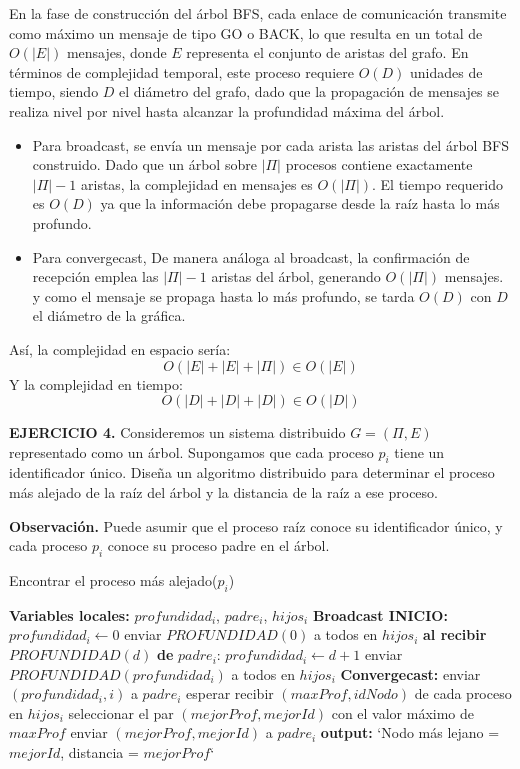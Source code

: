 \documentclass[12pt]{article}
\begin{document}
\noindent En la fase de construcción del árbol BFS, cada enlace de comunicación transmite como máximo un mensaje de tipo GO o BACK, lo que resulta en un total de $O(|E|)$ mensajes, donde $E$ representa el conjunto de aristas del grafo. En términos de complejidad temporal, este proceso requiere $O(D)$ unidades de tiempo, siendo $D$ el diámetro del grafo, dado que la propagación de mensajes se realiza nivel por nivel hasta alcanzar la profundidad máxima del árbol.
\begin{itemize}
    \item Para broadcast, se envía un mensaje por cada arista las aristas del árbol BFS construido. Dado que un árbol sobre $|\Pi|$ procesos contiene exactamente $|\Pi|-1$ aristas, la complejidad en mensajes es $O(|\Pi|)$. El tiempo requerido es $O(D)$ ya que la información debe propagarse desde la raíz hasta lo más profundo.

    \item Para convergecast, De manera análoga al broadcast, la confirmación de recepción emplea las $|\Pi|-1$ aristas del árbol, generando $O(|\Pi|)$ mensajes. y como el mensaje se propaga hasta lo más profundo, se tarda $O(D)$ con $D$ el diámetro de la gráfica.
\end{itemize}
Así, la complejidad en espacio sería:
\[O(|E| + |E| + |\Pi|) \in O(|E|)\]
Y la complejidad en tiempo:
\[O(|D| + |D| + |D|) \in O(|D|)\]


\begin{ejercicio}
\noindent \textbf{EJERCICIO 4.} 
Consideremos un sistema distribuido $G = (\Pi, E)$ representado como un árbol. Supongamos que cada proceso $p_i$ tiene un identificador único. Diseña un algoritmo distribuido para determinar el proceso más alejado de la raíz del árbol y la distancia de la raíz a ese proceso.

\noindent \textbf{Observación.} Puede asumir que el proceso raíz conoce su identificador único, y cada proceso $p_i$ conoce su proceso padre en el árbol. \\
\end{ejercicio}

\begin{algorithm}[H]
\caption{Encontrar el proceso más alejado($p_i$)}
\begin{algorithmic}[1]
\State \textbf{Variables locales:} $profundidad_i$, $padre_i$, $hijos_i$
\State \textbf{Broadcast INICIO:}
    \State $profundidad_i \gets 0$
    \State enviar $PROFUNDIDAD(0)$ a todos en $hijos_i$
\Else
    \State \textbf{al recibir} $PROFUNDIDAD(d)$ \textbf{de} $padre_i$:
    \State $profundidad_i \gets d + 1$
    \State enviar $PROFUNDIDAD(profundidad_i)$ a todos en $hijos_i$
\EndIf
\State \textbf{Convergecast:}
    \State enviar $(profundidad_i, i)$ a $padre_i$
\Else
    \State esperar recibir $(maxProf, idNodo)$ de cada proceso en $hijos_i$
    \State seleccionar el par $(mejorProf, mejorId)$ con el valor máximo de $maxProf$
        \State enviar $(mejorProf, mejorId)$ a $padre_i$
    \Else
        \State \textbf{output:} `Nodo más lejano = $mejorId$, distancia = $mejorProf$`
    \EndIf
\EndIf
\end{algorithmic}
\end{algorithm}
\end{document}
